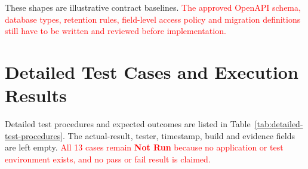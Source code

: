 \documentclass[a4paper,12pt]{article}
\newcommand{\weak}[1]{\textcolor{red}{#1}}
\begin{document}
These shapes are illustrative contract baselines. \weak{The approved OpenAPI schema, database types, retention rules, field-level access policy and migration definitions still have to be written and reviewed before implementation.}

\section{Detailed Test Cases and Execution Results}
Detailed test procedures and expected outcomes are listed in Table~\ref{tab:detailed-test-procedures}. The actual-result, tester, timestamp, build and evidence fields are left empty. \weak{All 13 cases remain \textbf{Not Run} because no application or test environment exists, and no pass or fail result is claimed.}

\begingroup
\scriptsize
\renewcommand{\arraystretch}{1.08}
\end{document}
